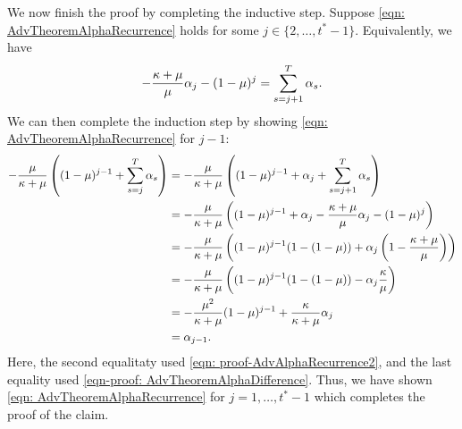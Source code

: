     We now finish the proof by completing the inductive step.  Suppose \eqref{eqn: AdvTheoremAlphaRecurrence} holds for some $j \in \{2, \ldots, t^*-1\}$. Equivalently, we have
    \begin{equation}
        \label{eqn: proof-AdvAlphaRecurrence2}
        - \frac{\kappa+\mu}{\mu}\alpha_j - (1-\mu)^j = \sum_{s=j+1}^T \alpha_s.
    \end{equation}
We can then complete the induction step by showing \eqref{eqn: AdvTheoremAlphaRecurrence} for $j-1$: 
    \begin{align*}
        -\frac{\mu}{\kappa+\mu} \left( (1-\mu)^{j-1} + \sum_{s=j}^T \alpha_s \right) &= -\frac{\mu}{\kappa+\mu} \left( (1-\mu)^{j-1} + \alpha_j + \sum_{s=j+1}^T \alpha_s \right)\\
        &= -\frac{\mu}{\kappa+\mu} \left( (1-\mu)^{j-1} + \alpha_j - \frac{\kappa+\mu}{\mu}\alpha_j - (1-\mu)^j \right)\\
        &= -\frac{\mu}{\kappa+\mu} \left( (1-\mu)^{j-1} (1- (1-\mu))  + \alpha_j \left( 1 - \frac{\kappa+\mu}{\mu} \right)\right)\\
        &= -\frac{\mu}{\kappa+\mu} \left( (1-\mu)^{j-1} (1- (1-\mu))  - \alpha_j  \frac{\kappa}{\mu} \right)\\
        &= -\frac{\mu^2}{\kappa+\mu} (1-\mu)^{j-1} + \frac{\kappa}{\kappa+\mu} \alpha_j\\
        &= \alpha_{j-1}.
    \end{align*}
    Here, the second equalitaty used \eqref{eqn: proof-AdvAlphaRecurrence2}, and the last equality used \eqref{eqn-proof: AdvTheoremAlphaDifference}. Thus, we have shown \eqref{eqn: AdvTheoremAlphaRecurrence} for $j=1,\ldots,t^*-1$ which completes the proof of the claim.   \hfill\Halmos



